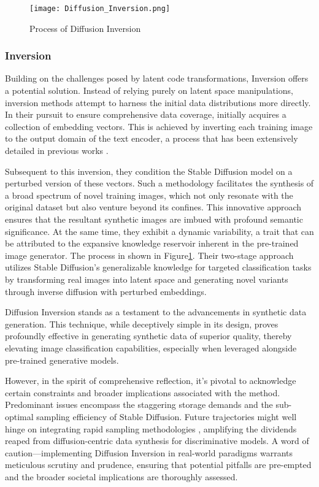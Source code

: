\documentclass[preprint,12pt,authoryear]{elsarticle}
\begin{document}
\begin{figure}
    \centering    \centerline{\texttt{[image: Diffusion\_Inversion.png]}}
    \caption{Process of Diffusion Inversion\cite{121_chatgpt_prompt} }
    \label{fig:Inveresion}
\end{figure}

\subsubsection{Inversion}

Building on the challenges posed by latent code transformations, Inversion offers a potential solution. Instead of relying purely on latent space manipulations, inversion methods attempt to harness the initial data distributions more directly. In their pursuit to ensure comprehensive data coverage, \cite{137_latent_code} initially acquires a collection of embedding vectors. This is achieved by inverting each training image to the output domain of the text encoder, a process that has been extensively detailed in previous works \cite{138_inversion,139_inversion,140_Inversion,141_Inversion}.  

Subsequent to this inversion, they condition the Stable Diffusion model on a perturbed version of these vectors. Such a methodology facilitates the synthesis of a broad spectrum of novel training images, which not only resonate with the original dataset but also venture beyond its confines. This innovative approach ensures that the resultant synthetic images are imbued with profound semantic significance. At the same time, they exhibit a dynamic variability, a trait that can be attributed to the expansive knowledge reservoir inherent in the pre-trained image generator. The process in shown in Figure\ref{fig:Inveresion}. Their two-stage approach utilizes Stable Diffusion’s generalizable knowledge for targeted classification tasks by transforming real images into latent space and generating novel variants through inverse
diffusion with perturbed embeddings.

Diffusion Inversion stands as a testament to the advancements in synthetic data generation. This technique, while deceptively simple in its design, proves profoundly effective in generating synthetic data of superior quality, thereby elevating image classification capabilities, especially when leveraged alongside pre-trained generative models.

However, in the spirit of comprehensive reflection, it's pivotal to acknowledge certain constraints and broader implications associated with the method. Predominant issues encompass the staggering storage demands and the sub-optimal sampling efficiency of Stable Diffusion. Future trajectories might well hinge on integrating rapid sampling methodologies \cite{142_Inversion}, amplifying the dividends reaped from diffusion-centric data synthesis for discriminative models. A word of caution—implementing Diffusion Inversion in real-world paradigms warrants meticulous scrutiny and prudence, ensuring that potential pitfalls are pre-empted and the broader societal implications are thoroughly assessed.
\end{document}
